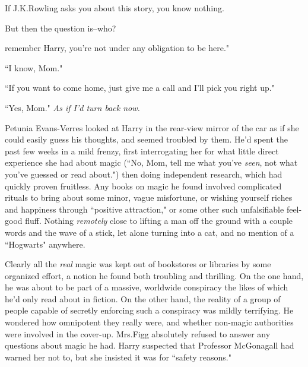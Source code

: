
\begin{chapterOpeningAuthorNote}
If J.\?K.\?Rowling asks you about this story, you know nothing.
\end{chapterOpeningAuthorNote}
\begin{chapterOpeningQuote}
But then the question is\---who?
\end{chapterOpeningQuote}

 remember Harry, you're not under any obligation to be here."

\hplettrineextrapara
``I know, Mom."

``If you want to come home, just give me a call and I'll pick you right up."

``Yes, Mom." \emph{As if I'd turn back now.}

Petunia Evans-Verres looked at Harry in the rear-view mirror of the car as if she could easily guess his thoughts, and seemed troubled by them. He'd spent the past few weeks in a mild frenzy, first interrogating her for what little direct experience she had about magic (``No, Mom, tell me what you've \emph{seen}, not what you've guessed or read about.") then doing independent research, which had quickly proven fruitless. Any books on magic he found involved complicated rituals to bring about some minor, vague misfortune, or wishing yourself riches and happiness through ``positive attraction," or some other such unfalsifiable feel-good fluff. Nothing \emph{remotely} close to lifting a man off the ground with a couple words and the wave of a stick, let alone turning into a cat, and no mention of a ``Hogwarts" anywhere.

Clearly all the \emph{real} magic was kept out of bookstores or libraries by some organized effort, a notion he found both troubling and thrilling. On the one hand, he was about to be part of a massive, worldwide conspiracy the likes of which he'd only read about in fiction. On the other hand, the reality of a group of people capable of secretly enforcing such a conspiracy was mildly terrifying. He wondered how omnipotent they really were, and whether non-magic authorities were involved in the cover-up. Mrs.\?Figg absolutely refused to answer any questions about magic he had. Harry suspected that Professor McGonagall had warned her not to, but she insisted it was for ``safety reasons."


